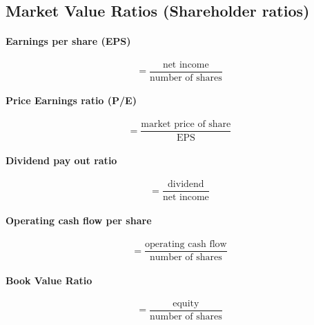 \documentclass[a4paper] {scrartcl}
\begin{document}

\subsection{Market Value Ratios (Shareholder ratios)} %
\label{sub:market_value_ratios_shareholder_ratios_}
\paragraph{Earnings per share (EPS)} %
\label{par:earnings_per_share_eps_}
\begin{equation}
	= \frac{\text{net income}}{\text{number of shares}}
\end{equation}

\paragraph{Price Earnings ratio (P/E)} %
\label{par:price_earnings_ratio}
\begin{equation}
	=\frac{\text{market price of share}}{\text{EPS}}
\end{equation}

\paragraph{Dividend pay out ratio} %
\label{par:dividend_pay_out_ratio}
\begin{equation}
	=\frac{\text{dividend}}{\text{net income}}
\end{equation}

\paragraph{Operating cash flow per share} %
\label{par:operating_cash_flow_per_share}
\begin{equation}
	=\frac{\text{operating cash flow}}{\text{number of shares}}
\end{equation}

\paragraph{Book Value Ratio} %
\label{par:book_value_ratio}
\begin{equation}
	=\frac{\text{equity}}{\text{number of shares}}
\end{equation}
\end{document}
